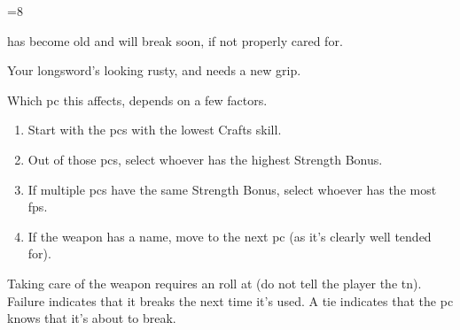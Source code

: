 \ifnum\value{r12}=8

 has become old and will break soon, if not properly cared for.
\begin{boxtext}
  Your longsword's looking rusty, and needs a new grip.
\end{boxtext}

Which \gls{pc} this affects, depends on a few factors.

\begin{enumerate}
  \item
  Start with the \glspl{pc} with the lowest Crafts \gls{skill}.
  \item
  Out of those \glspl{pc}, select whoever has the highest Strength Bonus.
  \item
  If multiple \glspl{pc} have the same Strength Bonus, select whoever has the most \glspl{fp}.
  \item
  If the \gls{weapon} has a name, move to the next \gls{pc} (as it's clearly well tended for).
\end{enumerate}

Taking care of the \gls{weapon} requires an  roll at \tn[10] (do not tell the player the \gls{tn}).
Failure indicates that it breaks the next time it's used.
A tie indicates that the \gls{pc} knows that it's about to break.

\fi
